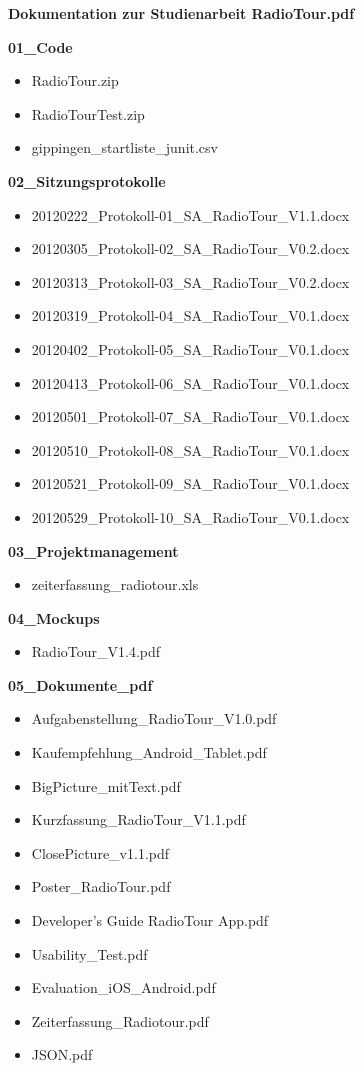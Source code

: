 \textbf{Dokumentation zur Studienarbeit RadioTour.pdf}

\textbf{01\_Code
}
\begin{itemize}
\item RadioTour.zip
\item RadioTourTest.zip
\item gippingen\_startliste\_junit.csv
\end{itemize}

\textbf{02\_Sitzungsprotokolle}
\begin{itemize}
\item 20120222\_Protokoll-01\_SA\_RadioTour\_V1.1.docx
\item 20120305\_Protokoll-02\_SA\_RadioTour\_V0.2.docx
\item 20120313\_Protokoll-03\_SA\_RadioTour\_V0.2.docx
\item 20120319\_Protokoll-04\_SA\_RadioTour\_V0.1.docx
\item 20120402\_Protokoll-05\_SA\_RadioTour\_V0.1.docx
\item 20120413\_Protokoll-06\_SA\_RadioTour\_V0.1.docx
\item 20120501\_Protokoll-07\_SA\_RadioTour\_V0.1.docx
\item 20120510\_Protokoll-08\_SA\_RadioTour\_V0.1.docx
\item 20120521\_Protokoll-09\_SA\_RadioTour\_V0.1.docx
\item 20120529\_Protokoll-10\_SA\_RadioTour\_V0.1.docx
\end{itemize}

\textbf{03\_Projektmanagement}
\begin{itemize}
\item zeiterfassung\_radiotour.xls
\end{itemize}

\textbf{04\_Mockups}
\begin{itemize}
\item RadioTour\_V1.4.pdf
\end{itemize}

\textbf{05\_Dokumente\_pdf}
\begin{itemize}
\item Aufgabenstellung\_RadioTour\_V1.0.pdf
\item Kaufempfehlung\_Android\_Tablet.pdf
\item BigPicture\_mitText.pdf			
\item Kurzfassung\_RadioTour\_V1.1.pdf
\item ClosePicture\_v1.1.pdf			
\item Poster\_RadioTour.pdf
\item Developer’s Guide RadioTour App.pdf	
\item Usability\_Test.pdf
\item Evaluation\_iOS\_Android.pdf		
\item Zeiterfassung\_Radiotour.pdf
\item JSON.pdf
\end{itemize}

